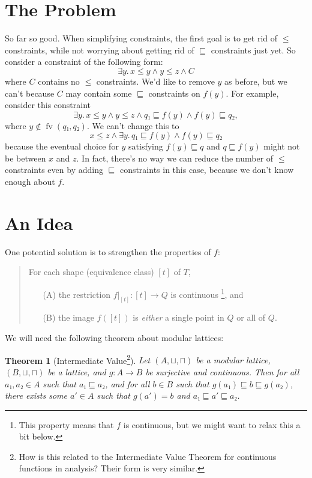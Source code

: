\documentclass[11pt]{article}
\newtheorem{thm}{Theorem}
\def\conj{\wedge}
\newcommand\fv{\mathop{\mathrm{fv}}}
\begin{document}
\section*{The Problem}

So far so good.  When simplifying constraints, the first goal is to get
rid of $≤$ constraints, while not worrying about getting rid of $⊑$
constraints just yet. So consider a constraint of the following form:
\begin{equation}
  ∃y.\, x ≤ y \conj y ≤ z \conj C
\end{equation}
where $C$ contains no $≤$ constraints.
We'd like to remove $y$ as before,
but we can't because $C$ may contain some $⊑$ constraints on
$f(y)$. For example, consider this constraint
\begin{equation}
    \label{eqn:hard}
    ∃y.\, x ≤ y \conj y ≤ z \conj q₁ ⊑ f(y) \conj f(y) ⊑ q₂,
\end{equation}
where $y ∉ \fv(q₁, q₂)$.  We can't change this to
\begin{equation}
   x ≤ z \conj ∃y.\, q₁ ⊑ f(y) \conj f(y) ⊑ q₂
   \label{eqn:hard:wrong}
\end{equation}
because the eventual choice for $y$ satisfying $f(y) ⊑ q$ and $q ⊑ f(y)$
might not be between $x$ and $z$. In fact, there's no way we can reduce
the number of $≤$ constraints even by adding $⊑$ constraints in this
case, because we don't know enough about $f$.

\section*{An Idea}

One potential solution is to strengthen the properties of $f$:
\begin{quote}
  For each shape (equivalence class) $[t]$ of $T$,
  \begin{itemize}
  \item[(A)]
    the restriction $f|_{[t]}\colon [t] → Q$ is continuous%
    \footnote{This property means that $f$ is continuous, but we might
    want to relax this a bit below.}, and
  \item[(B)]
    the image $f([t])$ is \emph{either} a single point in $Q$ or all of $Q$.
  \end{itemize}
\end{quote}

We will need the following theorem about modular lattices:
\begin{thm}[Intermediate Value\footnote{%
  \label{thm:ivt}
  How is this related to the Intermediate Value Theorem for
  continuous functions in analysis? Their form is very similar.}]
  Let $(A, ⊔, ⊓)$ be a modular lattice,
  $(B, ⊔, ⊓)$ be a lattice,
  and $g\colon A → B$ be surjective and continuous.
  Then for all $a₁, a₂ ∈ A$ such that $a₁ ⊑ a₂$,
  and for all $b ∈ B$ such that $g(a₁) ⊑ b ⊑ g(a₂)$,
  there exists some $a' ∈ A$ such that
  $g(a') = b$ and $a₁ ⊑ a' ⊑ a₂$.
\end{thm}
\end{document}
